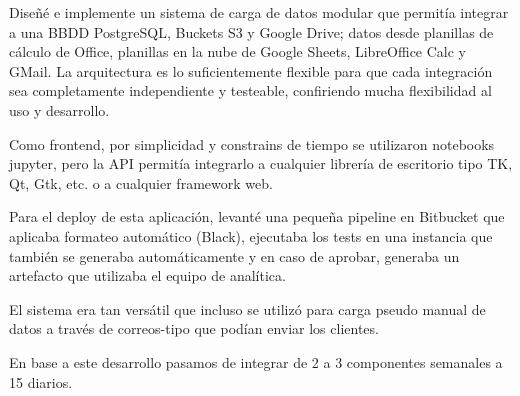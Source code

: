 

\begin{cvparagraph}
    Diseñé e implemente un sistema de carga de datos modular que permitía integrar a
    una BBDD PostgreSQL, Buckets S3 y Google Drive; datos desde planillas de cálculo
    de Office, planillas en la nube de Google Sheets, LibreOffice Calc y GMail. La
    arquitectura es lo suficientemente flexible para que cada integración sea
    completamente independiente y testeable, confiriendo mucha flexibilidad al uso y
    desarrollo.

    Como frontend, por simplicidad y constrains de tiempo se utilizaron notebooks
    jupyter, pero la API permitía integrarlo a cualquier librería de escritorio tipo
    TK, Qt, Gtk, etc. o a cualquier framework web.

    Para el deploy de esta aplicación, levanté una pequeña pipeline en Bitbucket que
    aplicaba formateo automático (Black), ejecutaba los tests en una instancia que
    también se generaba automáticamente y en caso de aprobar, generaba un artefacto
    que utilizaba el equipo de analítica.

    El sistema era tan versátil que incluso se utilizó para carga pseudo manual de
    datos a través de correos-tipo que podían enviar los clientes.

    En base a este desarrollo pasamos de integrar de 2 a 3 componentes semanales a
    15 diarios.

\end{cvparagraph}

\newpage

\null
{}

